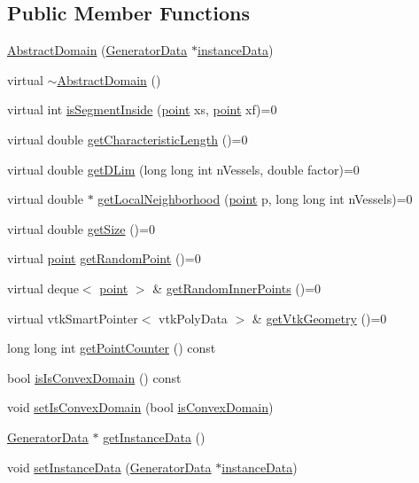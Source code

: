 \subsection*{Public Member Functions}
\begin{DoxyCompactItemize}
\item 
\hyperlink{class_abstract_domain_a18f82b7d0acdb24b3dcdf633510b200c}{Abstract\+Domain} (\hyperlink{class_generator_data}{Generator\+Data} $\ast$\hyperlink{class_abstract_domain_aa37fbabc2bfa92c574f7db7544016b53}{instance\+Data})
\item 
virtual \hyperlink{class_abstract_domain_abad047cac0d8ac7c409864a4e051c67f}{$\sim$\+Abstract\+Domain} ()
\item 
virtual int \hyperlink{class_abstract_domain_a8544eef21fb6700ecc02e9cd50884efd}{is\+Segment\+Inside} (\hyperlink{structpoint}{point} xs, \hyperlink{structpoint}{point} xf)=0
\item 
virtual double \hyperlink{class_abstract_domain_a90ca3dff64bab2428da8ced24e16f4c3}{get\+Characteristic\+Length} ()=0
\item 
virtual double \hyperlink{class_abstract_domain_ac9f39c12182608eb704c051e5d1cbc55}{get\+D\+Lim} (long long int n\+Vessels, double factor)=0
\item 
virtual double $\ast$ \hyperlink{class_abstract_domain_aee2b549d19062b261429f8a442fb4714}{get\+Local\+Neighborhood} (\hyperlink{structpoint}{point} p, long long int n\+Vessels)=0
\item 
virtual double \hyperlink{class_abstract_domain_a049564d82f2c177c39834dfc8da143dc}{get\+Size} ()=0
\item 
virtual \hyperlink{structpoint}{point} \hyperlink{class_abstract_domain_ae31a5b26d1dc628abe24da7a4d375415}{get\+Random\+Point} ()=0
\item 
virtual deque$<$ \hyperlink{structpoint}{point} $>$ \& \hyperlink{class_abstract_domain_a73d2c0e7c670b007bb5dbbdab5ad6b1b}{get\+Random\+Inner\+Points} ()=0
\item 
virtual vtk\+Smart\+Pointer$<$ vtk\+Poly\+Data $>$ \& \hyperlink{class_abstract_domain_abb1e386d2899cb6b725509259a836cd0}{get\+Vtk\+Geometry} ()=0
\item 
long long int \hyperlink{class_abstract_domain_a7d75c8de368f4d97c884b7003cac067c}{get\+Point\+Counter} () const 
\item 
bool \hyperlink{class_abstract_domain_a57291efb709950e97ffd7beb754cd271}{is\+Is\+Convex\+Domain} () const 
\item 
void \hyperlink{class_abstract_domain_a58af16f2954ae8c978c604bf18b99880}{set\+Is\+Convex\+Domain} (bool \hyperlink{class_abstract_domain_acaa76f4d7e102e66b64d10cd652167c9}{is\+Convex\+Domain})
\item 
\hyperlink{class_generator_data}{Generator\+Data} $\ast$ \hyperlink{class_abstract_domain_ad21236a7e37d5dc7763dd0a90d0233ce}{get\+Instance\+Data} ()
\item 
void \hyperlink{class_abstract_domain_a6607101a2ed91199d0675c3d33a029f7}{set\+Instance\+Data} (\hyperlink{class_generator_data}{Generator\+Data} $\ast$\hyperlink{class_abstract_domain_aa37fbabc2bfa92c574f7db7544016b53}{instance\+Data})
\end{DoxyCompactItemize}
